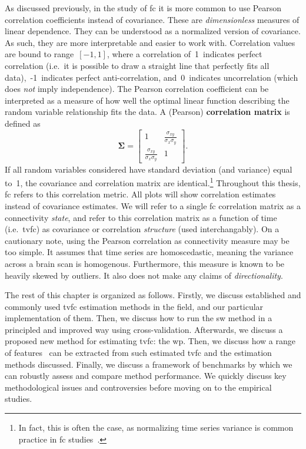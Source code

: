 As discussed previously, in the study of \gls{fc} it is more common to use Pearson correlation coefficients instead of covariance.
These are \emph{dimensionless} measures of linear dependence.
They can be understood as a normalized version of covariance.
As such, they are more interpretable and easier to work with.
Correlation values are bound to range~$[-1,1]$, where a correlation of~1~indicates perfect correlation (i.e.~it is possible to draw a straight line that perfectly fits all data),~-1~indicates perfect anti-correlation, and~0~indicates uncorrelation (which does \emph{not} imply independence).
The Pearson correlation coefficient can be interpreted as a measure of how well the optimal linear function describing the random variable relationship fits the data.
A (Pearson) \textbf{correlation matrix} is defined as
\begin{equation}
  \label{eq:correlation-matrix}
  \mathbf{\Sigma} = \begin{bmatrix}
    1 & \frac{\sigma_{xy}}{\sigma_x\sigma_y} \\
    \frac{\sigma_{xy}}{\sigma_x\sigma_y} & 1
  \end{bmatrix}.
\end{equation}
If all random variables considered have standard deviation (and variance) equal to~1, the covariance and correlation matrix are identical.\footnote{In fact, this is often the case, as normalizing time series variance is common practice in \gls{fc} studies~\parencite[see e.g.][]{Beckmann2004, Allen2014}.}
Throughout this thesis, \gls{fc} refers to this correlation metric.
All plots will show correlation estimates instead of covariance estimates.
%
We will refer to a single \gls{fc} correlation matrix as a connectivity \emph{state}, and refer to this correlation matrix as a function of time (i.e.~\gls{tvfc}) as covariance or correlation \emph{structure} (used interchangably).
%
On a cautionary note, using the Pearson correlation as connectivity measure may be too simple.
It assumes that time series are homoscedastic, meaning the variance across a brain scan is homogenous.
Furthermore, this measure is known to be heavily skewed by outliers.
It also does not make any claims of \emph{directionality}.

The rest of this chapter is organized as follows.
Firstly, we discuss established and commonly used \gls{tvfc} estimation methods in the field, and our particular implementation of them.
Then, we discuss how to run the \gls{sw} method in a principled and improved way using cross-validation.
Afterwards, we discuss a proposed new method for estimating \gls{tvfc}: the \gls{wp}.
Then, we discuss how a range of features~\parencite[or \emph{biomarkers} as they are often called in the context of neuroimaging, see e.g.][]{Woo2017, Douw2022} can be extracted from such estimated \gls{tvfc} and the estimation methods discussed.
%
Finally, we discuss a framework of benchmarks by which we can robustly assess and compare method performance.
%
We quickly discuss key methodological issues and controversies before moving on to the empirical studies.
